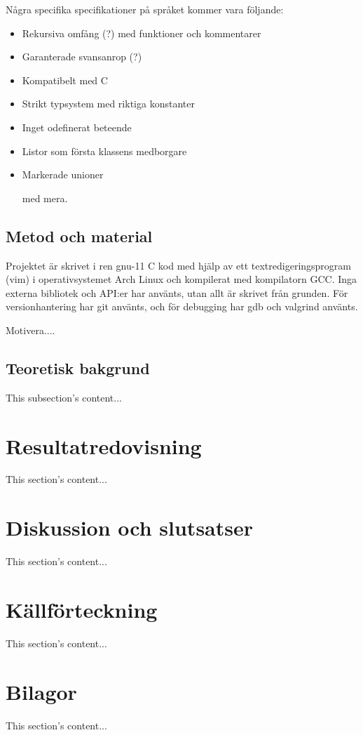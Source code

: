 \documentclass{theme}
\begin{document}
Några specifika specifikationer på språket kommer vara följande: 

\begin{itemize}
	\item Rekursiva omfång (?) med funktioner och kommentarer
	\item Garanterade svansanrop (?)
	\item Kompatibelt med C 
	\item Strikt typsystem med riktiga konstanter
	\item Inget odefinerat beteende
	\item Listor som första klassens medborgare
	\item Markerade unioner

	med mera.
\end{itemize}

\subsection{Metod och material}

Projektet är skrivet i ren gnu-11 C kod med hjälp av ett textredigeringsprogram 
(vim) i operativsystemet Arch Linux och kompilerat med kompilatorn GCC. Inga 
externa bibliotek och API:er har använts, utan allt är skrivet från grunden. För
versionhantering har git använts, och för debugging har gdb och valgrind 
använts.

Motivera....

\subsection{Teoretisk bakgrund}
This subsection's content...

\section{Resultatredovisning}
This section's content...

\subsection{}

\section{Diskussion och slutsatser}
This section's content...

\section{Källförteckning}
This section's content...

\section{Bilagor}
This section's content...
\end{document}
